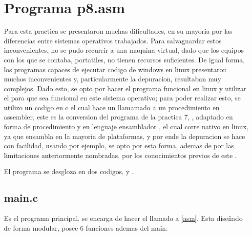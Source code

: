\section{Programa p8.asm}

Para esta practica se presentaron muchas dificultades, en su mayoria por las
diferencias entre sistemas operativos trabajados. Para salvaguardar estos
inconvenientes, no se pudo recurrir a una maquina virtual, dado que los equipos
con los que se contaba, portatiles, no tienen recursos suficientes. De igual
forma, los programas capaces de ejecutar codigo de windows en linux presentaron
muchos inconvenientes y, particularmente la depuracion, resultaban muy complejos.
Dado esto, se opto por hacer el programa funcional en linux y utilizar el
 para que sea funcional en este sistema
operativo; para poder realizar esto, se utilizo un codigo en c el cual hace un
llamamado a un procedimiento en assembler, este es la conversion del programa de
la practica 7, \Cite{pract7}, adaptado en forma de procedimiento y en lenguaje
ensamblador , el cual corre nativo en linux, ya que ensambla en la
mayoria de plataformas, y por ende la
depuracion se hace con facilidad, usando  por ejemplo, se opto por
esta forma, ademas de por las limitaciones anteriormente nombradas, por los
conocimientos previos de este .

El programa se desgloza en dos codigos,  y
.

\subsection*{main.c}
Es el programa principal, se encarga de hacer el llamado a \ref{asm}. Esta
diseñado de forma modular, posee 6 funciones ademas del main:

